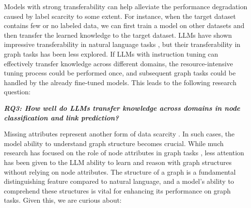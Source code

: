 Models with strong transferability can help alleviate the performance degradation caused by label scarcity to some extent. For instance, when the target dataset contains few or no labeled data, we can first train a model on other datasets and then transfer the learned knowledge to the target dataset. LLMs have shown impressive transferability in natural language tasks \cite{du2024unlocking, ran2024alopex}, but their transferability in graph tasks has been less explored. If LLMs with instruction tuning can effectively transfer knowledge across different domains, the resource-intensive tuning process could be performed once, and subsequent graph tasks could be handled by the already fine-tuned models. This leads to the following research question:




\vspace{0.5\baselineskip}
\begin{mdframed}[backgroundcolor=gray!8]
\textbf{\textit{RQ3: How well do LLMs transfer knowledge across domains in node classification and link prediction?}}
\end{mdframed}
\vspace{0.5\baselineskip}

Missing attributes represent another form of data scarcity \cite{chen2024data}. In such cases, the model ability to understand graph structure becomes crucial. While much research has focused on the role of node attributes in graph tasks \cite{chen2024text, yan2023comprehensive}, less attention has been given to the LLM ability to learn and reason with graph structures without relying on node attributes. The structure of a graph is a fundamental distinguishing feature compared to natural language, and a model’s ability to comprehend these structures is vital for enhancing its performance on graph tasks. Given this, we are curious about:

